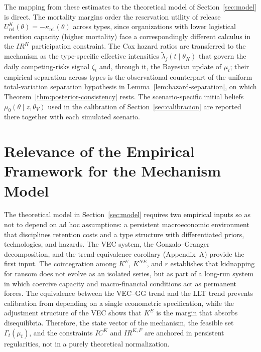 \documentclass[review,authoryear,12pt]{elsarticle}
\theoremstyle{plain}
\theoremstyle{definition}
\newcommand{\1}{\mathbf{1}}
\begin{document}
The mapping from these estimates to the theoretical model of Section~\ref{sec:model} is direct. The mortality margins order the reservation utility of release $U^K_{\mathrm{rel}}(\theta)=-\kappa_{\mathrm{rel}}(\theta)$ across types, since organizations with lower logistical retention capacity (higher mortality) face a correspondingly different calculus in the $IR^K$ participation constraint. The Cox hazard ratios are transferred to the mechanism as the type-specific effective intensities $\tilde\lambda_j(t\mid\theta_K)$ that govern the daily competing-risks signal $\zeta_t$ and, through it, the Bayesian update of $\mu_t$; their empirical separation across types is the observational counterpart of the uniform total-variation separation hypothesis in Lemma~\ref{lem:hazard-separation}, on which Theorem~\ref{thm:posterior-consistency} rests. The scenario-specific initial beliefs $\mu_0(\theta\mid z,\theta_V)$ used in the calibration of Section~\ref{sec:calibracion} are reported there together with each simulated scenario.

\section{Relevance of the Empirical Framework for the Mechanism Model}\label{sec:pertinencia}

The theoretical model in Section~\ref{sec:model} requires two empirical inputs so as not to depend on ad hoc assumptions: a persistent macroeconomic environment that disciplines retention costs and a type structure with differentiated priors, technologies, and hazards. The VEC system, the Gonzalo--Granger decomposition, and the trend-equivalence corollary (Appendix~A) provide the first input. The cointegration among $K^E$, $K^{NE}$, and $r$ establishes that kidnapping for ransom does not evolve as an isolated series, but as part of a long-run system in which coercive capacity and macro-financial conditions act as permanent forces. The equivalence between the VEC--GG trend and the LLT trend prevents calibration from depending on a single econometric specification, while the adjustment structure of the VEC shows that $K^E$ is the margin that absorbs disequilibria. Therefore, the state vector of the mechanism, the feasible set $\Gamma_t(\mu_t)$, and the constraints $IC^K$ and $IR^{K,F}$ are anchored in persistent regularities, not in a purely theoretical normalization.
\end{document}
